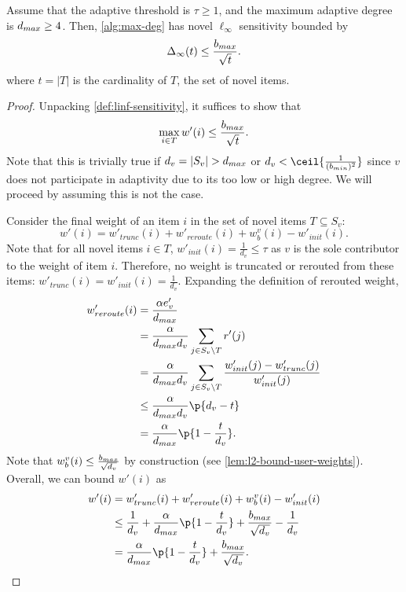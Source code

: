 \begin{lemma}\label{lem:linf-sensitivity-biased}
Assume that the adaptive threshold is $\tau \geq 1$, and the maximum adaptive degree is $d_{max} \geq 4$. Then, \cref{alg:max-deg} has novel $\ell_\infty$ sensitivity bounded by
\[
    \Delta_\infty(t) \leq \frac{b_{max}}{\sqrt{t}}.
\]
where $t = |T|$ is the cardinality of $T$, the set of novel items.
\end{lemma}
\begin{proof}
Unpacking \cref{def:linf-sensitivity}, it suffices to show that
\[
    \max_{i \in T} w'(i) \leq \frac{b_{max}}{\sqrt{t}}.
\]
Note that this is trivially true if $d_v = |S_v| > d_{max}$ or $d_v < \ceil{\frac{1}{(\bmin)^2}}$ since $v$ does not participate in adaptivity due to its too low or high degree. We will proceed by assuming this is not the case.

Consider the final weight of an item $i$ in the set of novel items $T \subseteq S_v$:
\begin{equation*}
    w'(i) = w'_{trunc}(i) + w'_{reroute}(i) + w^v_b(i) - w'_{init}(i). 
\end{equation*}
Note that for all novel items $i \in T$, $w'_{init}(i) = \frac{1}{d_v} \leq \tau$ as $v$ is the sole contributor to the weight of item $i$.
Therefore, no weight is truncated or rerouted from these items: $w'_{trunc}(i) = w'_{init}(i) =  \frac{1}{d_v}$.
Expanding the definition of rerouted weight,
\begin{align*}
    w'_{reroute}(i) &= \frac{\alpha e'_v}{\dmax} \\
    &= \frac{\alpha}{\dmax d_v} \sum_{j \in S_v \setminus T} r'(j) \\
    &= \frac{\alpha}{\dmax d_v} \sum_{j \in S_v \setminus T} \frac{w'_{init}(j) - w'_{trunc}(j)}{w'_{init}(j)} \\
    &\leq \frac{\alpha}{\dmax d_v} \p{d_v - t}\\
    &= \frac{\alpha}{\dmax}\p{1 - \frac{t}{d_v}}.
\end{align*}
Note that $w_b^v(i) \leq \frac{b_{max}}{\sqrt{d_v}}$ by construction (see \cref{lem:l2-bound-user-weights}).
Overall, we can bound $w'(i)$ as
\begin{align}
    w'(i) &= w'_{trunc}(i) + w'_{reroute}(i) + w^v_b(i) - w'_{init}(i) \notag \\
    &\leq \frac{1}{d_v} + \frac{\alpha}{\dmax}\p{1 - \frac{t}{d_v}} + \frac{\bmax}{\sqrt{d_v}} - \frac{1}{d_v} \notag \\
    &= \frac{\alpha}{\dmax}\p{1 - \frac{t}{d_v}} + \frac{\bmax}{\sqrt{d_v}}. \label{eq:linf-upper-bound}
\end{align}


\end{proof}
